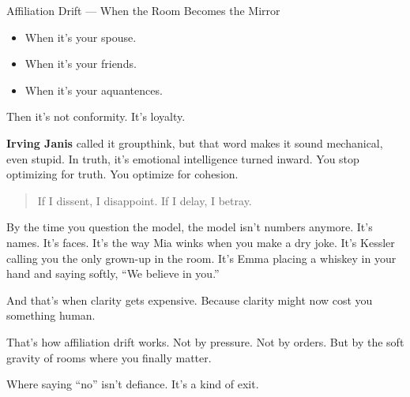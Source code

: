 \begin{PsychologicalSidebar}{Affiliation Drift --- When the Room Becomes the Mirror}
    \begin{itemize}
        \item When it’s your spouse.
        \item When it’s your friends.
        \item When it’s your aquantences.
    \end{itemize}
    
    Then it’s not conformity.
    It’s loyalty.
    
    \medskip
    
    \textbf{Irving Janis} called it groupthink, but that word makes it sound mechanical, even stupid.
    In truth, it’s emotional intelligence turned inward. You stop optimizing for truth. You optimize 
    for cohesion.
    
    \begin{quote}
    If I dissent, I disappoint.
    If I delay, I betray.
    \end{quote}
    
    By the time you question the model, the model isn’t numbers anymore.
    It’s names. It’s faces.
    It’s the way Mia winks when you make a dry joke.
    It’s Kessler calling you the only grown-up in the room.
    It’s Emma placing a whiskey in your hand and saying softly, “We believe in you.”
    
    \medskip
    
    And that’s when clarity gets expensive.
    Because clarity might now cost you something human.
    
    \medskip
    
    That’s how affiliation drift works.
    Not by pressure. Not by orders.
    But by the soft gravity of rooms where you finally matter.
    
    \medskip
    
    Where saying “no” isn’t defiance.
    It’s a kind of exit.
    
\end{PsychologicalSidebar}
    
    
